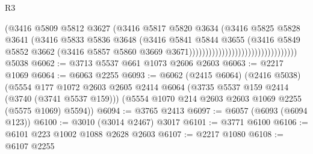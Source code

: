 \begin{lexlean}{R3}
\begin{coremodule}
                                                        (@3416
                                                          @5809
                                                          @5812
                                                          @3627
                                                          (@3416
                                                            @5817
                                                            @5820
                                                            @3634
                                                            (@3416
                                                              @5825
                                                              @5828
                                                              @3641
                                                              (@3416
                                                                @5833
                                                                @5836
                                                                @3648
                                                                (@3416
                                                                  @5841
                                                                  @5844
                                                                  @3655
                                                                  (@3416
                                                                    @5849
                                                                    @5852
                                                                    @3662
                                                                    (@3416
                                                                      @5857
                                                                      @5860
                                                                      @3669
                                                                      @3671)))))))))))))))))))))))))))))))))
    @5038
@6062 := @3713 @5537 @661 @1073 @2606 @2603
@6063 := @2217 @1069
@6064 := @6063 @2255
@6093 := @6062
    (@2415 @6064)
    (@2416 @5038)
    (@5554
      @177
      @1072
      @2603
      @2605
      @2414
      @6064
      (@3735 @5537 @159 @2414 (@3740 (@3741 @5537 @159)))
      (@5554 @1070 @214 @2603 @2603 @1069 @2255 (@5575 @1069) @5594))
@6094 := @3765 @2413
@6097 := @6057 (@6093 (@6094 @123))
@6100 := @3010 (@3014 @2467) @3017
@6101 := @3771 @6100
@6106 := @6101 @223 @1002 @1088 @2628 @2603
@6107 := @2217 @1080
@6108 := @6107 @2255

\end{coremodule}
\end{lexlean}
